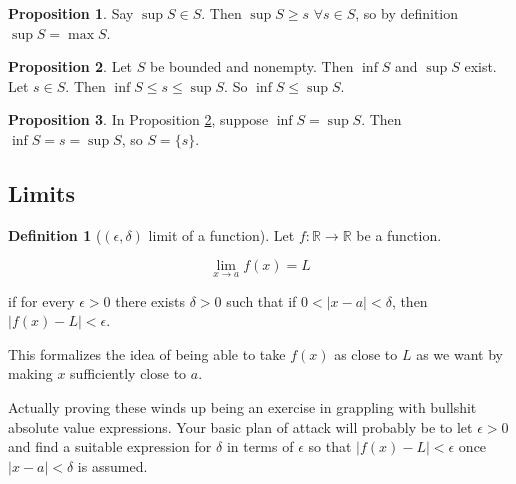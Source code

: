 \documentclass{article}
\theoremstyle{definition}
\newtheorem{definition}{Definition}[section]
\newtheorem{proposition}{Proposition}[section]
\begin{document}
\begin{proposition}
Say $\sup S \in S$. Then $\sup S \ge s$ $\forall s \in S$, so by definition $\sup S = \max S$.
\end{proposition}

\begin{proposition} \label{bound-comparison}
Let $S$ be bounded and nonempty. Then $\inf S$ and $\sup S$ exist. Let $s \in S$. Then $\inf S \le s \le \sup S$.
So $\inf S \le \sup S$.
\end{proposition}

\begin{proposition}
In Proposition \ref{bound-comparison}, suppose $\inf S = \sup S$. Then $\inf S = s = \sup S$, so $S = \{s\}$.
\end{proposition}

\subsection{Limits}


\begin{definition}[$(\epsilon, \delta)$ limit of a function]

Let $f: \mathbb{R} \to \mathbb{R}$ be a function. 

\begin{equation}
\lim_{x \to a} f(x) = L
\end{equation}

if for every $\epsilon > 0$ there exists $\delta > 0$ such that if $0 < |x-a| <
\delta$, then $|f(x) - L| < \epsilon$.
 
\end{definition}

This formalizes the idea of being able to take $f(x)$ as close to $L$ as we want
by making $x$ sufficiently close to $a$.

Actually proving these winds up being an exercise in grappling with bullshit
absolute value expressions. Your basic plan of attack will probably be to let
$\epsilon > 0$ and find a suitable expression for $\delta$ in terms of
$\epsilon$ so that $|f(x) -L| < \epsilon$ once $|x-a|< \delta$ is assumed.
\end{document}
